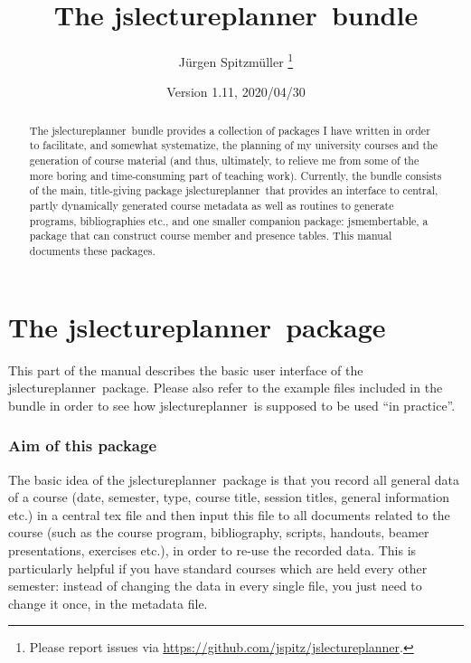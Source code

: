 \documentclass[english]{article}
\newcommand*\jslp{\textsf{jslectureplanner}}
\newcommand*\jsmt{\textsf{jsmembertable}}
\begin{document}
\title{The \jslp\ bundle}

\author{Jürgen Spitzmüller%
\thanks{Please report issues via \protect\url{https://github.com/jspitz/jslectureplanner}.}}

\date{Version 1.11, 2020/04/30}

\maketitle

\begin{abstract}
\noindent The \jslp\ bundle provides a collection of packages
I have written in order to facilitate, and somewhat systematize,
the planning of my university courses and the generation of course material
(and thus, ultimately, to relieve me from some of the more boring and
time-consuming part of teaching work).
Currently, the bundle consists of the main, title-giving package \jslp\
that provides an interface to central, partly dynamically generated course
metadata as well as routines to generate programs, bibliographies etc., and one
smaller companion package: \jsmt, a package that can construct course
member and presence tables. This manual documents these packages.
\end{abstract}

\tableofcontents

\clearpage

\part{The \jslp\ package}

This part of the manual describes the basic user interface of the
\jslp\ package.
Please also refer to the example files included in the bundle in order to
see how \jslp\ is supposed to be used ``in practice''.

\section{Aim of this package}

The basic idea of the \jslp\ package is that you record
all general data of a course (date, semester, type, course title, session titles,
general information etc.) in a central tex file and then input this
file to all documents related to the course (such as the course program,
bibliography, scripts, handouts, beamer presentations, exercises etc.),
in order to re-use the recorded data.
This is particularly helpful if you have standard courses which
are held every other semester: instead of changing the data in every
single file, you just need to change it once, in the metadata file.
\end{document}
